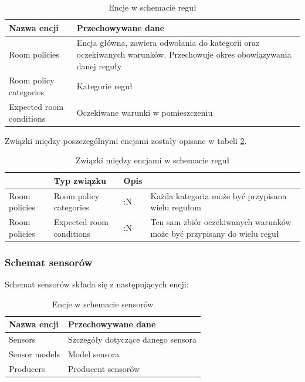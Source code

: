 \documentclass[11pt, a4]{article} %
\begin{document}
\begin{table}[!ht]
    \caption{Encje w schemacie reguł}
    \label{tab:encje-regul}
    \begin{tabularx}{1\textwidth} { 
        | >{\raggedright\arraybackslash}X        
        | >{\raggedleft\arraybackslash}X | }
        \hline
       Nazwa encji & Przechowywane dane \\
       \hline
       Room policies & 
       Encja główna, zawiera odwołania do kategorii oraz oczekiwanych warunków. Przechowuje 
       okres obowiązywania danej reguły \\
       \hline
       Room policy categories & Kategorie reguł \\
       \hline
       Expected room conditions & Oczekiwane warunki w pomieszczeniu \\
       \hline
    \end{tabularx}
\end{table}

Związki między poszczególnymi encjami zostały opisane w tabeli \ref{tab:zwiazki-reguly}.


\begin{table}[!ht]
    \caption{Związki między encjami w schemacie reguł}
    \label{tab:zwiazki-reguly}
\begin{tabularx}{1\textwidth} { 
        | >{\arraybackslash}X    
        | >{\arraybackslash}X
        | >{\arraybackslash}X     
        | >{\arraybackslash}X | }
        \hline
    \multicolumn{2}{|c|}{Relacja} & Typ związku & Opis \\
    \hline
    Room policies & Room policy categories & 1:N & 
    Każda kategoria może być przypisana wielu regułom \\
    \hline
    Room policies & Expected room conditions & 1:N & 
    Ten sam zbiór oczekiwanych warunków może być przypisany do wielu reguł \\
    \hline
    \end{tabularx}
\end{table}

\subsubsection{Schemat sensorów}

Schemat sensorów składa się z następujących encji:

\begin{table}[!ht]
    \caption{Encje w schemacie sensorów}
    \label{tab:encje-sensorow}
    \begin{tabularx}{1\textwidth} { 
        | >{\raggedright\arraybackslash}X        
        | >{\raggedleft\arraybackslash}X | }
        \hline
       Nazwa encji & Przechowywane dane \\
       \hline
       Sensors & Szczegóły dotyczące danego sensora \\
       Sensor models & Model sensora \\
       Producers & Producent sensorów \\
       \hline
    \end{tabularx}
\end{table}
\end{document}
